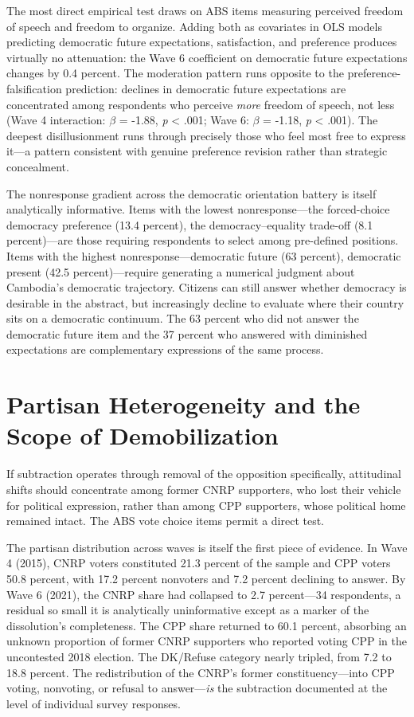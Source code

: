 \documentclass[
  12pt,
  letterpaper]{article}
\begin{document}
The most direct empirical test draws on ABS items measuring perceived
freedom of speech and freedom to organize. Adding both as covariates in
OLS models predicting democratic future expectations, satisfaction, and
preference produces virtually no attenuation: the Wave 6 coefficient on
democratic future expectations changes by 0.4 percent. The moderation
pattern runs opposite to the preference-falsification prediction:
declines in democratic future expectations are concentrated among
respondents who perceive \emph{more} freedom of speech, not less (Wave 4
interaction: \(\beta\) = -1.88, \emph{p} \textless{} .001; Wave 6:
\(\beta\) = -1.18, \emph{p} \textless{} .001). The deepest
disillusionment runs through precisely those who feel most free to
express it---a pattern consistent with genuine preference revision
rather than strategic concealment.

The nonresponse gradient across the democratic orientation battery is
itself analytically informative. Items with the lowest nonresponse---the
forced-choice democracy preference (13.4 percent), the
democracy--equality trade-off (8.1 percent)---are those requiring
respondents to select among pre-defined positions. Items with the
highest nonresponse---democratic future (63 percent), democratic present
(42.5 percent)---require generating a numerical judgment about
Cambodia's democratic trajectory. Citizens can still answer whether
democracy is desirable in the abstract, but increasingly decline to
evaluate where their country sits on a democratic continuum. The 63
percent who did not answer the democratic future item and the 37 percent
who answered with diminished expectations are complementary expressions
of the same process.

\section{Partisan Heterogeneity and the Scope of
Demobilization}\label{partisan-heterogeneity-and-the-scope-of-demobilization}

If subtraction operates through removal of the opposition specifically,
attitudinal shifts should concentrate among former CNRP supporters, who
lost their vehicle for political expression, rather than among CPP
supporters, whose political home remained intact. The ABS vote choice
items permit a direct test.

The partisan distribution across waves is itself the first piece of
evidence. In Wave 4 (2015), CNRP voters constituted 21.3 percent of the
sample and CPP voters 50.8 percent, with 17.2 percent nonvoters and 7.2
percent declining to answer. By Wave 6 (2021), the CNRP share had
collapsed to 2.7 percent---34 respondents, a residual so small it is
analytically uninformative except as a marker of the dissolution's
completeness. The CPP share returned to 60.1 percent, absorbing an
unknown proportion of former CNRP supporters who reported voting CPP in
the uncontested 2018 election. The DK/Refuse category nearly tripled,
from 7.2 to 18.8 percent. The redistribution of the CNRP's former
constituency---into CPP voting, nonvoting, or refusal to
answer---\emph{is} the subtraction documented at the level of individual
survey responses.
\end{document}

